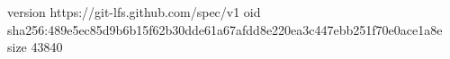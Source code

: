 version https://git-lfs.github.com/spec/v1
oid sha256:489e5ec85d9b6b15f62b30dde61a67afdd8e220ea3c447ebb251f70e0ace1a8e
size 43840
